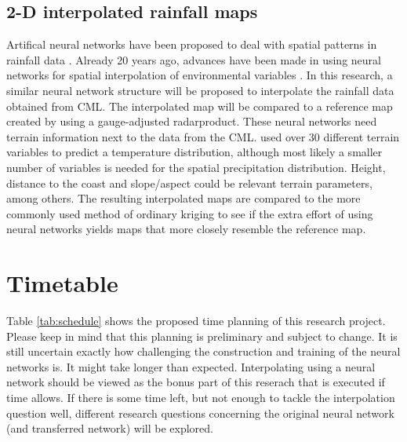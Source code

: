\documentclass[twocolumn, 10pt, a4paper]{article}
\begin{document}
	\subsection{2-D interpolated rainfall maps}
	Artifical neural networks have been proposed to deal with spatial patterns in rainfall data \cite{Sadeghi2019}. Already 20 years ago, advances have been made in using neural networks for spatial interpolation of environmental variables \cite{Rigol2001}. In this research, a similar neural network structure will be proposed to interpolate the rainfall data obtained from CML. The interpolated map will be compared to a reference map created by using a gauge-adjusted radarproduct.
	These neural networks need terrain information next to the data from the CML.  used over 30 different terrain variables to predict a temperature distribution, although most likely a smaller number of variables is needed for the spatial precipitation distribution. Height, distance to the coast and slope/aspect could be relevant terrain parameters, among others.
	The resulting interpolated maps are compared to the more commonly used method of ordinary kriging  to see if the extra effort of using neural networks yields maps that more closely resemble the reference map.
	
	
	\section{Timetable}
	
	Table \ref{tab:schedule} shows the proposed time planning of this research project. Please keep in mind that this planning is preliminary and subject to change. It is still uncertain exactly how challenging the construction and training of the neural networks is. It might take longer than expected. Interpolating using a neural network should be viewed as the bonus part of this reserach that is executed if time allows. If there is some time left, but not enough to tackle the interpolation question well, different research questions concerning the original neural network (and transferred network) will be explored.
	
\end{document}
